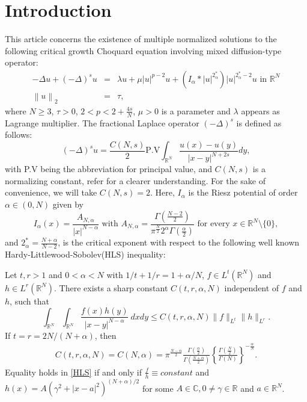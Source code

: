 \documentclass[11pt]{article}
\numberwithin{equation}{section}
\numberwithin{mytheorem}{section}
\begin{document}
	\section{Introduction}
	This article concerns the existence of multiple normalized solutions to the following critical growth Choquard equation involving mixed diffusion-type operator:
	\begin{equation}\label{prob}
		\begin{array}{rcl}
			-\Delta u +(-\Delta)^s u & = & \lambda u +\mu |u|^{p-2}u +(I_{\alpha}*|u|^{2^*_{\alpha}})|u|^{2^*_{\alpha}-2}u \text{ in } \mathbb{R}^N\\
			\left\| u \right\|_2 & =  & \tau,
		\end{array}
	\end{equation}
	where $N\geq 3$, $\tau>0$, $2<p<2+\frac{4s}{N}$, $\mu>0$ is a parameter and $\lambda$ appears as Lagrange multiplier. The fractional Laplace operator $(-\Delta)^s$ is defined as follows:
	\begin{equation*}
		(-\Delta)^s u = \frac{C(N,s)}{2}\text{P.V} \int_{\mathbb{R}^N}\frac{u(x)-u(y)}{|x-y|^{N+2s}}dy,
	\end{equation*}
	with P.V being the abbreviation for principal value, and $C(N,s)$ is a normalizing constant, refer \cite{Nezza2012hitchhiker} for a clearer understanding.
	For the sake of convenience, we will take $C(N,s)=2$. Here,	$I_{\alpha}$ is the Riesz potential of order $\alpha\in (0,N)$ given by
	\begin{equation}\label{A_alpha}
		I_{\alpha}(x)=\frac{A_{N,\alpha}}{|x|^{N-\alpha}}\text{ with } A_{N,\alpha}=\frac{\Gamma(\frac{N-2}{2})}{\pi^{\frac{N}{2}}2^{\alpha}\Gamma(\frac{\alpha}{2})}\text{ for every }x\in\mathbb{R}^N\setminus \{0\},
	\end{equation}
	and $2^*_{\alpha}=\frac{N+\alpha}{N-2}$, is the critical exponent with respect to the following well known Hardy-Littlewood-Sobolev(HLS) inequality:
	\begin{proposition}\label{prop1.1}
		Let $t,r>1$ and $0<\alpha <N$ with $1/t+1/r=1+\alpha/N$, $f\in L^t(\mathbb{R}^N)$ and $h\in L^r(\mathbb{R}^N)$. There exists a sharp constant $C(t,r,\alpha,N)$ independent of $f$ and $h$, such that
		\begin{equation}\label{HLS}
			\int_{\mathbb{R}^N}\int_{\mathbb{R}^N}\frac{f(x)h(y)}{|x-y|^{N-\alpha}}~dxdy \leq C(t,r,\alpha,N) \|f\|_{L^t}\|h\|_{L^r}.
		\end{equation}
		If $t=r=2N/(N+\alpha)$, then
		\begin{align}\label{C_alpha}
			C(t,r,\alpha,N)=C(N,\alpha)= \pi^{\frac{N-\alpha}{2}}\frac{\Gamma(\frac{\alpha}{2})}{\Gamma(\frac{N+\alpha}{2})}\left\lbrace \frac{\Gamma(\frac{N}{2})}{\Gamma(N)}\right\rbrace^{-\frac{\alpha}{N}}.
		\end{align}
		Equality holds in  \eqref{HLS} if and only if $\frac{f}{h}\equiv constant$ and
		$\displaystyle h(x)= A(\gamma^2+|x-a|^2)^{(N+\alpha)/2}$
		for some $A\in \mathbb{C}, 0\neq \gamma \in \mathbb{R}$ and $a \in \mathbb{R}^N$.
	\end{proposition}
\end{document}
